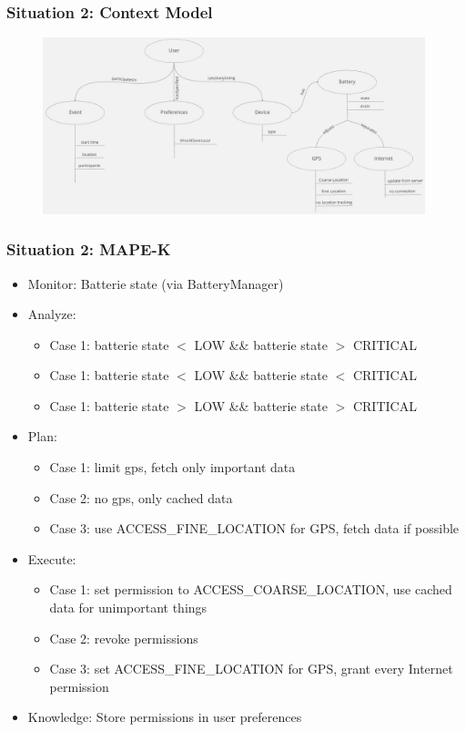 \documentclass[aspectratio=169]{beamer}
\begin{document}
\begin{frame}
	\frametitle{Situation 2: Context Model}
	 \begin{figure}
		\centering
		\includegraphics[width=0.99\textwidth]{media/contextmodel2.jpg}
	\end{figure}
\end{frame}

\begin{frame}   
	\frametitle{Situation 2: MAPE-K}
	\begin{itemize}
		\item Monitor: Batterie state (via BatteryManager)
		\item Analyze: 
			 \begin{itemize} 
				\item Case 1: batterie state $<$ LOW \&\& batterie state $>$ CRITICAL
				\item Case 1: batterie state $<$ LOW \&\& batterie state $<$ CRITICAL
				\item Case 1: batterie state $>$ LOW \&\& batterie state $>$ CRITICAL
			\end{itemize}
		\item Plan:
			\begin{itemize}
				\item Case 1: limit gps, fetch only important data 
				\item Case 2: no gps, only cached data
				\item Case 3: use ACCESS\_FINE\_LOCATION for GPS, fetch data if possible
			\end{itemize}
		\item Execute:
			\begin{itemize}
				\item Case 1: set permission to ACCESS\_COARSE\_LOCATION, use cached data for unimportant things
    				\item Case 2: revoke permissions
    				\item Case 3: set ACCESS\_FINE\_LOCATION for GPS, grant every Internet permission
			\end{itemize}
		\item Knowledge: Store permissions in user preferences
	\end{itemize}
\end{frame}
\end{document}
